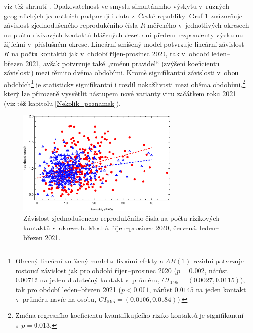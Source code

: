 \begin{enumerate}
viz též shrnutí \cite{kluveitOpat}. 
Opakovatelnost ve smyslu simultánního výskytu v~různých geografických jednotkách podporují i data z~České republiky. Graf \ref{fig:okresy} znázorňuje závislost zjednodušeného reprodukčního čísla $R$ měřeného v~jednotlivých okresech na počtu rizikových kontaktů hlášených deset dní předem respondenty výzkumu \cite{paqcovid} žijícími v~příslušném okrese. Lineární smíšený model potvrzuje lineární závislost $R$ na počtu kontaktů jak v~období říjen-prosinec 2020, tak v~období leden--březen 2021, avšak potvrzuje také „změnu pravidel“ (zvýšení koeficientu závislosti) mezi těmito dvěma obdobími. Kromě signifikantní závislosti v~obou obdobích\footnote{Obecný lineární smíšený model s~fixními efekty a $AR(1)$ rezidui potvrzuje rostoucí závislost jak pro období říjen--prosinec 2020 ($p=0.002$, nárůst $0.00712$ na jeden dodatečný kontakt v~průměru, $CI_{0.95}=(0.0027,0.0115)$), tak pro období leden--březen 2021 ($p<0.001$, nárůst $0.0145$ na jeden kontakt v~průměru navíc na osobu, $CI_{0.95}=(0.0106,0.0184)$).} je statisticky signifikantní i rozdíl na\-kaž\-li\-vos\-ti mezi oběma obdobími,\footnote{Změna regresního koeficientu kvantifikujícího riziko kontaktů je signifikantní s~$p=0.013$.} který lze přirozeně vysvětlit nástupem nové varianty viru začátkem roku 2021 (viz též kapitolu \ref{Nekolik_poznamek}).


\begin{figure}
\begin{center}
\includegraphics[width=8cm]{pic/sbornikRegrese010.eps}
\caption{Závislost zjednodušeného reprodukčního čísla na počtu rizikových kontaktů v~okresech. Modrá: říjen--prosinec 2020, červená: leden--březen 2021.}
\label{fig:okresy}
\end{center}
\end{figure}


\end{enumerate}
